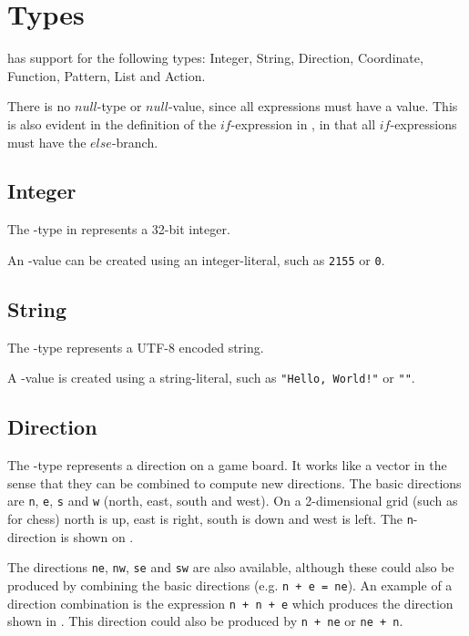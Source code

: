 \section{Types}
\label{sec:types}

\productname{} has support for the following types: Integer, String, Direction, Coordinate,
Function, Pattern, List and Action.

There is no $null$-type or $null$-value, since all expressions must have a value. This
is also evident in the definition of the $if$-expression in , in that
all $if$-expressions must have the $else$-branch.

\subsection{Integer}
The -type in \productname{} represents a 32-bit integer.

An -value can be created using an integer-literal, such as \texttt{2155} or \texttt{0}.

\subsection{String}
The -type represents a UTF-8 encoded string.

A -value is created using a string-literal, such as \texttt{"Hello, World!"} or \texttt{""}.

\subsection{Direction}
The -type represents a direction on a game board. It works like a vector
in the sense that they can be combined to compute new directions. The basic directions
are \texttt{n}, \texttt{e}, \texttt{s} and \texttt{w} (north, east, south and west).
On a 2-dimensional grid (such as for chess) north is up, east is right, south is down and 
west is left. The \texttt{n}-direction is shown on .

The directions \texttt{ne}, \texttt{nw},
\texttt{se} and \texttt{sw} are also available, although these could also be produced
by combining the basic directions (e.g. \texttt{n + e = ne}). An example of a direction combination is the
expression \texttt{n + n + e} which produces
the direction shown in . This direction could also be produced by
\texttt{n + ne} or \texttt{ne + n}.

